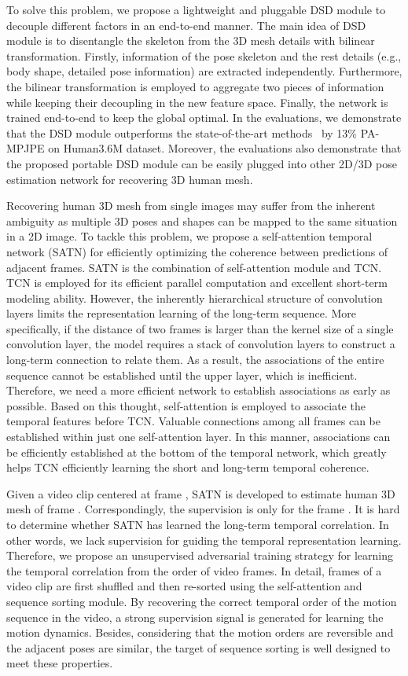\documentclass[10pt,twocolumn,letterpaper]{article}
\begin{document}
To solve this problem, we propose a lightweight and pluggable DSD module to decouple different factors in an end-to-end manner. The main idea of DSD module is to disentangle the skeleton from the 3D mesh details with bilinear transformation. Firstly, information of the pose skeleton and the rest details (e.g., body shape, detailed pose information) are extracted independently. Furthermore, the bilinear transformation is employed to aggregate two pieces of information while keeping their decoupling in the new feature space. Finally, the network is trained end-to-end to keep the global optimal. In the evaluations, we demonstrate that the DSD module outperforms the state-of-the-art methods~\cite{kanazawa2018learning} by 13\% PA-MPJPE on Human3.6M dataset. Moreover, the evaluations also demonstrate that the proposed portable DSD module can be easily plugged into other 2D/3D pose estimation network for recovering 3D human mesh.

Recovering human 3D mesh from single images may suffer from the inherent ambiguity as multiple 3D poses and shapes can be mapped to the same situation in a 2D image. To tackle this problem, we propose a self-attention temporal network (SATN) for efficiently optimizing the coherence between predictions of adjacent frames. SATN is the combination of self-attention module and TCN. TCN is employed for its efficient parallel computation and excellent short-term modeling ability. However, the inherently hierarchical structure of convolution layers limits the representation learning of the long-term sequence. More specifically, if the distance of two frames is larger than the kernel size of a single convolution layer, the model requires a stack of convolution layers to construct a long-term connection to relate them. As a result, the associations of the entire sequence cannot be established until the upper layer, which is inefficient. Therefore, we need a more efficient network to establish associations as early as possible. Based on this thought, self-attention is employed to associate the temporal features before TCN. Valuable connections among all frames can be established within just one self-attention layer. In this manner, associations can be efficiently established at the bottom of the temporal network, which greatly helps TCN  efficiently learning the short and long-term temporal coherence.


Given a video clip centered at frame , SATN is developed to estimate human 3D mesh of frame . Correspondingly, the supervision is only for the frame . It is hard to determine whether SATN has learned the long-term temporal correlation. In other words, we lack supervision for guiding the temporal  representation learning. Therefore, we propose an unsupervised adversarial training strategy for learning the temporal correlation from the order of video frames. In detail, frames of a video clip are first shuffled and then re-sorted using the self-attention and sequence sorting module. By recovering the correct temporal order of the motion sequence in the video, a strong supervision signal is generated for learning the motion dynamics. Besides, considering that the motion orders are reversible and the adjacent poses are similar, the target of sequence sorting is well designed to meet these properties.
\end{document}
